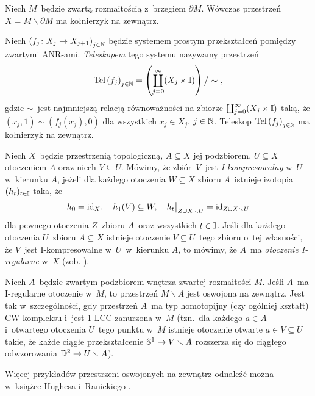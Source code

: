 \begin{ex}\noindent
\begin{compactenum}
\item Niech $M$~będzie zwartą rozmaitością z~brzegiem $\partial M$. Wówczas przestrzeń $X=M\smallsetminus \partial M$ ma kołnierzyk na zewnątrz. %
\item Niech $\left(f_j\colon X_j\to X_{j+1}\right)_{j\in\mN}$ będzie systemem prostym przekształceń pomiędzy zwartymi ANR-ami. \textit{Teleskopem} tego systemu nazywamy przestrzeń \[\operatorname{Tel}\left(f_j\right)_{j\in\mN}=\left(\coprod_{j=0}^{\infty} (X_j\times \I)\right)\big/\sim\ ,\] gdzie $\sim$~jest najmniejszą relacją równoważności na zbiorze $\coprod_{j=0}^\infty (X_j\times \I)$ taką, że $(x_j,1)\sim (f_j(x_j),0)$ dla wszystkich $x_j\in X_j$, $j\in\mN$. Teleskop $\operatorname{Tel}\left(f_j\right)_{j\in\mN}$ ma kołnierzyk na zewnątrz.
\item Niech $X$~będzie przestrzenią topologiczną, $A\subseteq X$ jej podzbiorem, $U\subseteq X$ otoczeniem $A$ oraz niech $V\subseteq U$. Mówimy, że zbiór~$V$~jest \textit{I-kompresowalny} w~$U$ w~kierunku $A$, jeżeli dla każdego otoczenia $W\subseteq X$ zbioru $A$~istnieje izotopia $(h_t)_{t\in \I}$ taka, że \[h_0=\id_X,\quad h_1(V)\subseteq W, \quad h_t\big|_{Z\cup X\smallsetminus U}=\id_{Z\cup X\smallsetminus U}\] dla pewnego otoczenia $Z$~zbioru $A$~oraz wszystkich $t\in \I$. Jeśli dla każdego otoczenia $U$~zbioru $A\subseteq X$ istnieje otoczenie $V\subseteq U$~tego zbioru o~tej własności, że $V$~jest I-kompresowalne w~$U$~w~kierunku $A$, to mówimy, że $A$~ma \textit{otoczenie I-regularne} w~$X$ (zob. \cite{Siebenmann73}).

Niech $A$~będzie zwartym podzbiorem wnętrza zwartej rozmaitości $M$. Jeśli $A$~ma I-regularne otoczenie w~$M$, to przestrzeń $M\smallsetminus A$ jest oswojona na zewnątrz. Jest tak w~szczególności, gdy przestrzeń $A$~ma typ homotopijny (czy ogólniej kształt) CW kompleksu i~jest 1-LCC zanurzona w~$M$ (tzn.~dla każdego $a\in A$ i~otwartego otoczenia $U$~tego punktu w~$M$ istnieje otoczenie otwarte $a\in V\subseteq U$ takie, że każde ciągłe przekształcenie $\S^1\to V\smallsetminus A$ rozszerza się do ciągłego odwzorowania $\D^2\to U\smallsetminus A$).
\item Więcej przykładów przestrzeni oswojonych na zewnątrz odnaleźć można w~książce Hughesa i~Ranickiego \cite{Hughes96}.
\end{compactenum}
\end{ex}

